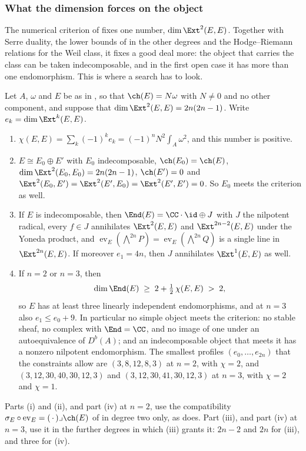 \subsubsection*{What the dimension forces on the object}

The numerical criterion of  fixes one number,
$\dim\Ext^{2}(E,E)$. Together with Serre duality, the lower bounds of
 in the other degrees and the Hodge--Riemann relations for
the Weil class, it fixes a good deal more: the object that carries the class
can be taken indecomposable, and in the first open case it has more than one
endomorphism. This is where a search has to look.

\begin{theorem}
\label{thm:p2endo}
Let $A$, $\omega$ and $E$ be as in , so that
$\ch(E)=N\omega$ with $N\ne0$ and no other component, and suppose that
$\dim\Ext^{2}(E,E)=2n(2n-1)$. Write $e_{k}=\dim\Ext^{k}(E,E)$.
\begin{enumerate}[label=\textup{(\roman*)},leftmargin=2.6em,itemsep=2pt]
\item $\chi(E,E)=\sum_{k}(-1)^{k}e_{k}=(-1)^{n}N^{2}\int_{A}\omega^{2}$, and
  this number is positive.
\item $E\cong E_{0}\oplus E'$ with $E_{0}$ indecomposable,
  $\ch(E_{0})=\ch(E)$, $\dim\Ext^{2}(E_{0},E_{0})=2n(2n-1)$, $\ch(E')=0$ and
  $\Ext^{2}(E_{0},E')=\Ext^{2}(E',E_{0})=\Ext^{2}(E',E')=0$. So $E_{0}$ meets
  the criterion as well.
\item If $E$ is indecomposable, then $\End(E)=\CC\cdot\id\oplus J$ with $J$
  the nilpotent radical, every $f\in J$ annihilates $\Ext^{2}(E,E)$ and
  $\Ext^{2n-2}(E,E)$ under the Yoneda product, and
  $\operatorname{ev}_{E}(\bigwedge^{2n}P)=\operatorname{ev}_{E}(\bigwedge^{2n}Q)$
  is a single line in $\Ext^{2n}(E,E)$. If moreover $e_{1}=4n$, then $J$
  annihilates $\Ext^{1}(E,E)$ as well.
\item If $n=2$ or $n=3$, then
  \[
    \dim\End(E)\;\ge\;2+\tfrac12\,\chi(E,E)\;>\;2,
  \]
  so $E$ has at least three linearly independent endomorphisms, and at
  $n=3$ also $e_{1}\le e_{0}+9$. In particular no simple object meets the
  criterion: no stable sheaf, no complex with $\End=\CC$, and no image of one
  under an autoequivalence of $D^{b}(A)$; and an indecomposable object that
  meets it has a nonzero nilpotent endomorphism. The smallest profiles
  $(e_{0},\dots,e_{2n})$ that the constraints allow are $(3,8,12,8,3)$ at
  $n=2$, with $\chi=2$, and $(3,12,30,40,30,12,3)$ and $(3,12,30,41,30,12,3)$
  at $n=3$, with $\chi=2$ and $\chi=1$.
\end{enumerate}
Parts (i) and (ii), and part (iv) at $n=2$, use the compatibility
$\sigma_{E}\circ\operatorname{ev}_{E}=(\,\cdot\,)\lrcorner\ch(E)$ of
 in degree two only, as  does. Part
(iii), and part (iv) at $n=3$, use it in the further degrees in which
(iii) grants it: $2n-2$ and $2n$ for (iii), and three for
(iv).
\end{theorem}

